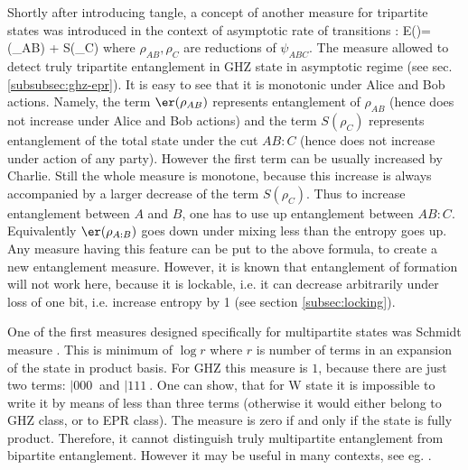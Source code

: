 \documentclass[twocolumn,aps,rmp]{revtex4}
\begin{document}
Shortly after introducing tangle, a concept of another measure
for tripartite states was introduced in the context of asymptotic
rate of transitions \cite{LPSW1999}:
\be
E(\psi)=\er(\rho_{AB}) + S(\rho_C)
\ee
where $\rho_{AB},\rho_C$ are reductions of $\psi_{ABC}$.
The measure allowed to detect truly tripartite
entanglement in GHZ state in asymptotic regime (see sec. \ref{subsubsec:ghz-epr}).
It is easy to see that it is monotonic under Alice and Bob actions.
Namely, the term $\er(\rho_{AB})$ represents entanglement of $\rho_{AB}$
(hence does not increase under Alice and Bob actions)
and the term $S(\rho_C)$ represents entanglement of the total
state under the cut $AB:C$ (hence does not increase under action of any party).
However the first term can be usually increased by Charlie.
Still the whole measure is monotone, because this increase is always
accompanied by a larger decrease of the term $S(\rho_C)$.
Thus to increase entanglement between $A$ and $B$,
one has to use up entanglement between $AB:C$.
Equivalently $\er(\rho_{A:B})$ goes down under mixing less than the entropy
goes up. Any measure having this feature can be put to the above formula,
to create a new entanglement measure. However, it is known that entanglement
of formation will not work here, because it is lockable, i.e. it can decrease
arbitrarily under loss of one bit, i.e. increase entropy by 1 (see section
\ref{subsec:locking}).

One of the first measures designed specifically for multipartite
states was Schmidt measure \cite{EisertB2000-Schmidt}. This
is minimum of $\log r$ where $r$ is number of terms in an expansion
of the state in product basis. For GHZ this measure is $1$, because
there are just two terms: $|000\>$ and $|111\>$. One can show, that
for W state it is impossible to write it by means of less than three
terms (otherwise it would either belong to GHZ class, or to EPR
class).
The measure is zero if and only if the state is fully product.
Therefore, it cannot distinguish truly multipartite entanglement from
bipartite entanglement. However it may be useful in many contexts,
see eg. \cite{MoraB2005-compl-ent}.
\end{document}
